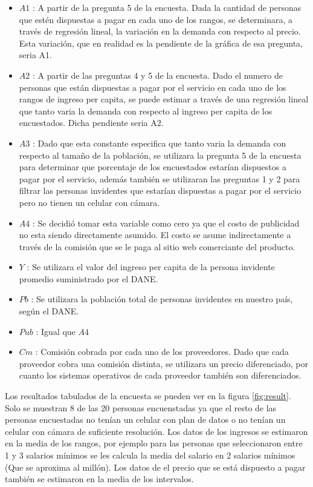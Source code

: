 \documentclass[a4paper, 12pt, oneside]{article}
\begin{document}
	\begin{itemize}
	      \item $A1$ : A partir de la pregunta 5 de la encuesta. Dada la cantidad de personas que estén dispuestas a pagar en cada uno de los rangos, se determinara, a través de regresión lineal, la variación en la demanda con respecto al precio. Esta variación, que en realidad es la pendiente de la gráfica de esa pregunta, seria A1.
	      \item $A2$ : A partir de las preguntas 4 y 5 de la encuesta. Dado el numero de personas que están dispuestas a pagar por el servicio en cada uno de los rangos de ingreso per capita, se puede estimar a través de una regresión lineal que tanto varia la demanda con respecto al ingreso per capita de los encuestados. Dicha pendiente seria A2.
	      \item $A3$ : Dado que esta constante especifica que tanto varia la demanda con respecto al tamaño de la población, se utilizara la pregunta 5 de la encuesta para determinar que porcentaje de los encuestados estarían dispuestos a pagar por el servicio, además también se utilizaran las preguntas 1 y 2 para filtrar las personas invidentes que estarían dispuestas a pagar por el servicio pero no tienen un celular con cámara.
	      \item $A4$ : Se decidió tomar esta variable como cero ya que el costo de publicidad no esta siendo directamente asumido. El costo se asume indirectamente a través de la comisión que se le paga al sitio web comerciante del producto.
	      \item $Y$ : Se utilizara el valor del ingreso per capita de la persona invidente promedio suministrado por el DANE.
	      \item $Pb$ : Se utilizara la población total de personas invidentes en nuestro país, según el DANE.
	      \item $Pub$ : Igual que $A4$
	      \item $Cm$ : Comisión cobrada por cada uno de los proveedores. Dado que cada proveedor cobra una comisión distinta, se utilizara un precio diferenciado, por cuanto los sistemas operativos de cada proveedor también son diferenciados.
	\end{itemize}
	
	Los resultados tabulados de la encuesta se pueden ver en la figura \ref{fig:result}. Solo se muestran 8 de las 20 personas encuenstadas ya que el resto de las personas encuestadas no tenían un celular con plan de datos o no tenían un celular con cámara de suficiente resolución. Los datos de los ingresos se estimaron en la media de los rangos, por ejemplo para las personas que seleccionaron entre 1 y 3 salarios mínimos se les calcula la media del salario en 2 salarios mínimos (Que se aproxima al millón). Los datos de el precio que se está dispuesto a pagar también se estimaron en la media de los intervalos.
	
\end{document}
